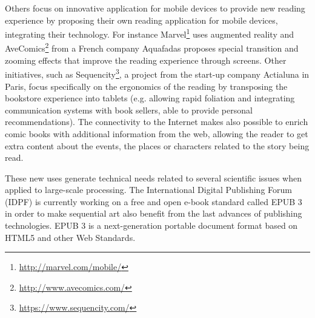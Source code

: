 Others focus on innovative application for mobile devices to provide new reading experience by proposing their own reading application for mobile devices, integrating their technology.
For instance Marvel\footnote{\url{http://marvel.com/mobile/}} uses augmented reality and AveComics\footnote{\url{http://www.avecomics.com/}} from a French company Aquafadas proposes special transition and zooming effects that improve the reading experience through screens.
Other initiatives, such as Sequencity\footnote{\url{https://www.sequencity.com/}}, a project from the start-up company Actialuna in Paris, focus specifically on the ergonomics of the reading by transposing the bookstore experience into tablets (e.g. allowing rapid foliation and integrating communication systems with book sellers, able to provide personal recommendations).
The connectivity to the Internet makes also possible to enrich comic books with additional information from the web,
allowing the reader to get extra content about the events, the places or characters related to the story being read.

These new uses generate technical needs related to several
scientific issues when applied to large-scale processing. 
The International Digital Publishing Forum (IDPF) is currently working on a free and open e-book standard called EPUB 3 in order to make sequential art also benefit from the last advances of publishing technologies.
EPUB 3 is a next-generation portable document format based on HTML5 and other Web Standards.







